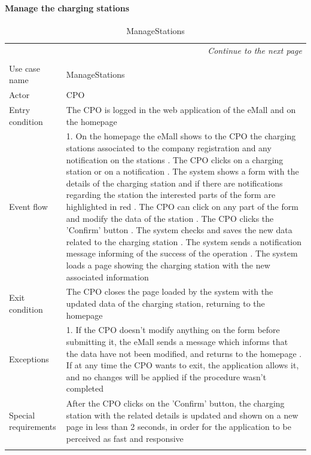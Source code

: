 \paragraph{Manage the charging stations}
\begin{center}
    \begin{longtable}{p{4cm} p{11cm}}
    \multicolumn{2}{r}{\itshape{Continue to the next page}}\\
    \endfoot 
    \\
    \endlastfoot
    \hline
     Use case name &  ManageStations\\
     \hline
     Actor & CPO \\
     \hline
     Entry condition & The CPO is logged in the web application of the eMall and on the homepage \\
     \hline
     Event flow &   1. On the homepage the eMall shows to the CPO the charging stations associated to the company                   registration and any notification on the stations \newline
                    2. The CPO clicks on a charging station or on a notification \newline 
                    3. The system shows a form with the details of the charging station and if there are notifications regarding the station the interested parts of the form are highlighted in red \newline
                    4. The CPO can click on any part of the form and modify the data of the station \newline
                    5. The CPO clicks the 'Confirm' button \newline
                    6. The system checks and saves the new data related to the charging station \newline
                    7. The system sends a notification message informing of the success of the operation \newline
                    8. The system loads a page showing the charging station with the new associated information\\
     \hline
     Exit condition &  The CPO closes the page loaded by the system with the updated data of the charging station, returning to the homepage \\
     \hline
     Exceptions &   1. If the CPO doesn't modify anything on the form before submitting it, the eMall sends a                       message which informs that the data have not been modified, and returns to the homepage \newline
                    2. If at any time the CPO wants to exit, the application allows it, and no changes will be applied if the procedure wasn't completed \\
     \hline
     Special requirements & After the CPO clicks on the 'Confirm' button, the charging station with the related details is updated and shown on a new page in less than 2 seconds, in order for the application to be perceived as fast and responsive \\
     \hline
    \caption{ManageStations}
    \label{tab:ManageStations}
    \end{longtable}
\end{center}
